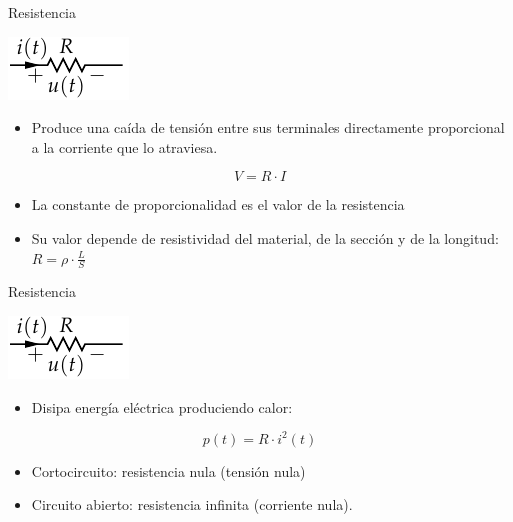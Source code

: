 \documentclass[xcolor={usenames,svgnames,dvipsnames}]{beamer}
\begin{document}
\begin{frame}[label={sec:orgf24258a}]{Resistencia}
\begin{center}
\includegraphics[height=0.2\textheight]{../figs/Resistencia.pdf}
\end{center}


\begin{itemize}
\item \alert{Produce una caída de tensión entre sus terminales directamente
proporcional a la corriente que lo atraviesa}.
\end{itemize}
\[
V=R\cdot I
\]
\begin{itemize}
\item La constante de proporcionalidad es el valor de la resistencia

\item Su valor depende de resistividad del material, de la sección y de la
longitud: \(R=\rho\cdot\frac{L}{S}\)
\end{itemize}
\end{frame}

\begin{frame}[label={sec:org31ad3de}]{Resistencia}
\begin{center}
\includegraphics[height=0.2\textheight]{../figs/Resistencia.pdf}
\end{center}


\begin{itemize}
\item Disipa energía eléctrica produciendo \alert{calor}:
\end{itemize}
\[
p(t)=R\cdot i^{2}(t)
\]

\begin{itemize}
\item Cortocircuito: resistencia nula (tensión nula)

\item Circuito abierto: resistencia infinita (corriente nula).
\end{itemize}
\end{frame}
\end{document}
